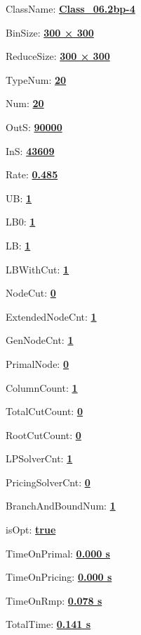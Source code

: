 \documentclass[11pt]{article}
\begin{document}
\pagestyle{empty}


ClassName: \underline{\textbf{Class_06.2bp-4}}
\par
BinSize: \underline{\textbf{300 × 300}}
\par
ReduceSize: \underline{\textbf{300 × 300}}
\par
TypeNum: \underline{\textbf{20}}
\par
Num: \underline{\textbf{20}}
\par
OutS: \underline{\textbf{90000}}
\par
InS: \underline{\textbf{43609}}
\par
Rate: \underline{\textbf{0.485}}
\par
UB: \underline{\textbf{1}}
\par
LB0: \underline{\textbf{1}}
\par
LB: \underline{\textbf{1}}
\par
LBWithCut: \underline{\textbf{1}}
\par
NodeCut: \underline{\textbf{0}}
\par
ExtendedNodeCnt: \underline{\textbf{1}}
\par
GenNodeCnt: \underline{\textbf{1}}
\par
PrimalNode: \underline{\textbf{0}}
\par
ColumnCount: \underline{\textbf{1}}
\par
TotalCutCount: \underline{\textbf{0}}
\par
RootCutCount: \underline{\textbf{0}}
\par
LPSolverCnt: \underline{\textbf{1}}
\par
PricingSolverCnt: \underline{\textbf{0}}
\par
BranchAndBoundNum: \underline{\textbf{1}}
\par
isOpt: \underline{\textbf{true}}
\par
TimeOnPrimal: \underline{\textbf{0.000 s}}
\par
TimeOnPricing: \underline{\textbf{0.000 s}}
\par
TimeOnRmp: \underline{\textbf{0.078 s}}
\par
TotalTime: \underline{\textbf{0.141 s}}
\par
\newpage
\end{document}
